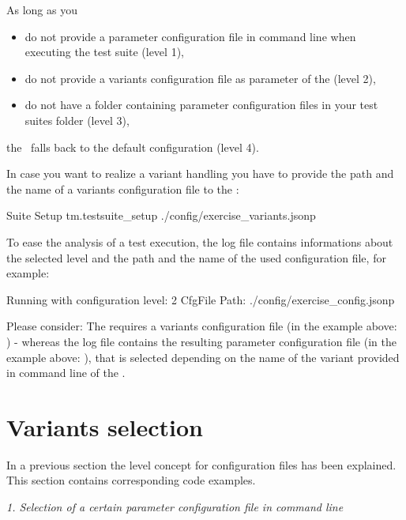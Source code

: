 As long as you
\begin{itemize}
   \item do not provide a parameter configuration file in command line when executing the test suite (level 1),
   \item do not provide a variants configuration file as parameter of the  (level 2),
   \item do not have a  folder containing parameter configuration files in your test suites folder (level 3),
\end{itemize}
the \pkg\ falls back to the default configuration (level 4).

In case you want to realize a variant handling you have to provide the path and the name of a variants configuration file to the :

\begin{robotcode}
Suite Setup    tm.testsuite_setup    ./config/exercise_variants.jsonp
\end{robotcode}

To ease the analysis of a test execution, the log file contains informations about the selected level and the path and the name of the used
configuration file, for example:

\begin{robotlog}
Running with configuration level: 2
CfgFile Path: ./config/exercise_config.jsonp
\end{robotlog}

Please consider: The  requires a variants configuration file (in the example above: ) - whereas
the log file contains the resulting parameter configuration file (in the example above: ), that is selected depending
on the name of the variant provided in command line of the \rfwcore.

\newpage

\section{Variants selection}

In a previous section the level concept for configuration files has been explained. This section contains corresponding code examples.

\textit{1. Selection of a certain parameter configuration file in command line}

